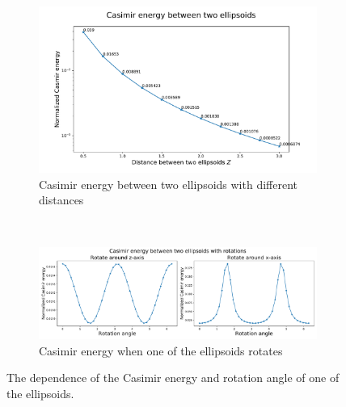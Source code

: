     \begin{figure}[H]
        \begin{subfigure}{\linewidth}
            \centering
            \includegraphics[scale = 0.5]{figures/CasE_ellipsoids.pdf}
            \caption{Casimir energy between two ellipsoids with different distances}
            \label{Casimir energy between two ellipsoids with different distances}
            \end{subfigure}\\[1ex]
    
        \begin{subfigure}{\linewidth}
        \centering
        \hspace*{-1cm}\includegraphics[scale = 0.5]{figures/CasE_ellipsoids_with_rotation.pdf}
        \caption{Casimir energy when one of the ellipsoids rotates}
        \label{Casimir energy when one of the ellipsoids rotates}
        \end{subfigure}
        \caption{The dependence of the Casimir energy and rotation angle of one of the ellipsoids.} 
        \end{figure}

